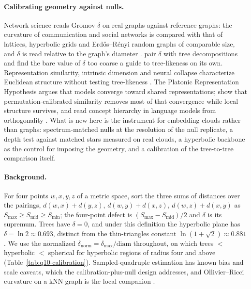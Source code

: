 \documentclass{article}
\begin{document}
\paragraph{Calibrating geometry against nulls.} Network science reads Gromov $\delta$ on real graphs against reference graphs: the curvature of communication and social networks is compared with that of lattices, hyperbolic grids and Erd\H{o}s--R\'{e}nyi random graphs of comparable size, and $\delta$ is read relative to the graph's diameter \citep{narayan2011curvature, kennedy2013hyperbolicity}. \citet{adcock2013treelike} pair $\delta$ with tree decompositions and find the bare value of $\delta$ too coarse a guide to tree-likeness on its own. Representation similarity, intrinsic dimension and neural collapse characterize Euclidean structure without testing tree-likeness \citep{kornblith2019cka, ansuini2019intrinsic, pope2021intrinsic, papyan2020prevalence}. The Platonic Representation Hypothesis argues that models converge toward shared representations; \citet{groger2026aristotelian} show that permutation-calibrated similarity removes most of that convergence while local structure survives, and \citet{park2024geometry} read concept hierarchy in language models from orthogonality \citep{huh2024platonic, koepke2026cave}. What is new here is the instrument for embedding clouds rather than graphs: spectrum-matched nulls at the resolution of the null replicate, a depth test against matched stars measured on real clouds, a hyperbolic backbone as the control for imposing the geometry, and a calibration of the tree-to-tree comparison itself.

\paragraph{Background.} For four points $w,x,y,z$ of a metric space, sort the three sums of distances over the pairings, $d(w,x){+}d(y,z)$, $d(w,y){+}d(x,z)$, $d(w,z){+}d(x,y)$ as $S_{\max}\ge S_{\mathrm{mid}}\ge S_{\min}$; the four-point defect is $(S_{\max}-S_{\mathrm{mid}})/2$ and $\delta$ is its supremum. Trees have $\delta=0$, and under this definition the hyperbolic plane has $\delta=\ln 2\approx0.693$, distinct from the thin-triangles constant $\ln(1+\sqrt2)\approx0.881$ \citep{nica2016strong}. We use the normalized $\delta_{\text{norm}}=\delta_{\max}/\mathrm{diam}$ throughout, on which trees $<$ hyperbolic $<$ spherical for hyperbolic regions of radius four and above (Table~\ref{tab:q10-calibration}). Sampled-quadruple estimation has known bias and scale caveats, which the calibration-plus-null design addresses, and Ollivier--Ricci curvature on a kNN graph is the local companion \citep{fournier2015computing, ollivier2009ricci}.
\end{document}
